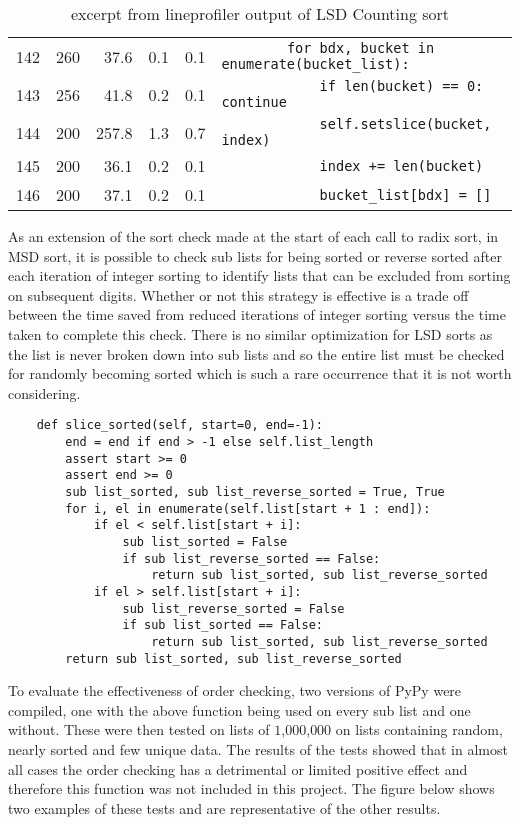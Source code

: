 \documentclass[12pt]{article}
\begin{document}
\begin{table}[H]
{{\begin{tabular}{rrrrrl}
	 142 & 260   & 37.6   & 0.1    & 0.1  &  \;\;\;\;\;\;\;\;\lstinline{        for bdx, bucket in enumerate(bucket_list):}\\
	 143 & 256   & 41.8   & 0.2    & 0.1  &  \;\;\;\;\;\;\;\;\;\;\;\;\lstinline{            if len(bucket) == 0: continue}\\
	 144 & 200   & 257.8  & 1.3    & 0.7  &  \;\;\;\;\;\;\;\;\;\;\;\;\lstinline{            self.setslice(bucket, index)}\\
	 145 & 200   & 36.1   & 0.2    & 0.1  &  \;\;\;\;\;\;\;\;\;\;\;\;\lstinline{            index += len(bucket)}\\
	 146 & 200   & 37.1   & 0.2    & 0.1  &  \;\;\;\;\;\;\;\;\;\;\;\;\lstinline{            bucket_list[bdx] = []}\\
	 \hline
		\end{tabular}
		}}
		\caption*{excerpt from line\textunderscore profiler output of LSD Counting sort}
	\end{table}
\pagebreak
{}
\label{sssec:orderchecking}
As an extension of the sort check made at the start of each call to radix sort, in MSD sort, it is possible to check sub lists for being sorted or reverse sorted after each iteration of integer sorting to identify lists that can be excluded from sorting on subsequent digits. Whether or not this strategy is effective is a trade off between the time saved from reduced iterations of integer sorting versus the time taken to complete this check. There is no similar optimization for LSD sorts as the list is never broken down into sub lists and so the entire list must be checked for randomly becoming sorted which is such a rare occurrence that it is not worth considering.
\par
\begin{lstlisting}	
	def slice_sorted(self, start=0, end=-1):
		end = end if end > -1 else self.list_length
		assert start >= 0
		assert end >= 0
		sub list_sorted, sub list_reverse_sorted = True, True
		for i, el in enumerate(self.list[start + 1 : end]):
			if el < self.list[start + i]:
				sub list_sorted = False
				if sub list_reverse_sorted == False:
					return sub list_sorted, sub list_reverse_sorted
			if el > self.list[start + i]:
				sub list_reverse_sorted = False
				if sub list_sorted == False:
					return sub list_sorted, sub list_reverse_sorted
		return sub list_sorted, sub list_reverse_sorted
\end{lstlisting}
\par
To evaluate the effectiveness of order checking, two versions of PyPy were compiled, one with the above function being used on every sub list and one without. These were then tested on lists of $1$,$000$,$000$ on lists containing random, nearly sorted and few unique data. The results of the tests showed that in almost all cases the order checking has a detrimental or limited positive effect and therefore this function was not included in this project. The figure below shows two examples of these tests and are representative of the other results.
\end{document}
